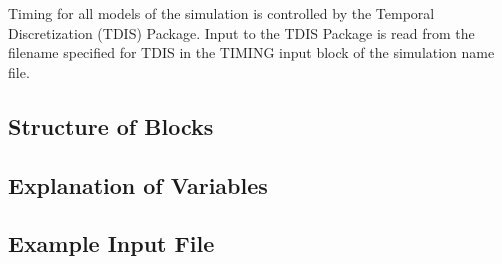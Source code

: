 Timing for all models of the simulation is controlled by the Temporal Discretization (TDIS) Package.  Input to the TDIS Package is read from the filename specified for TDIS in the TIMING input block of the simulation name file.

\vspace{5mm}
\subsection{Structure of Blocks}




\vspace{5mm}
\subsection{Explanation of Variables}
\begin{description}

\end{description}

\vspace{5mm}
\subsection{Example Input File}



